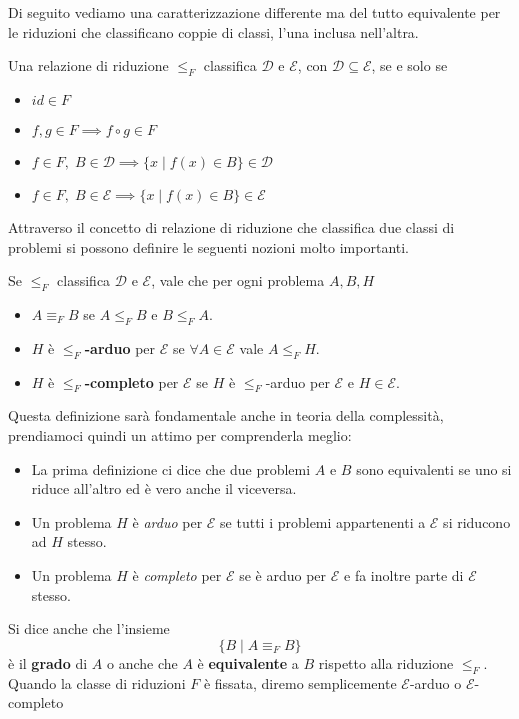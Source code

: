 Di seguito vediamo una caratterizzazione differente ma del tutto
equivalente per le riduzioni che classificano coppie di classi,
l'una inclusa nell'altra.

\begin{lemma} \label{lemma: classificazione}
	Una relazione di riduzione $\leq_F$ classifica $\mathcal{D}$
	e $\mathcal{E}$, con $\mathcal{D} \subseteq \mathcal{E}$, se
	e solo se
	\begin{itemize}
		\item $id \in F$
		\item $f, g \in F \implies f \circ g \in F$
		\item $f \in F, \; B \in \mathcal{D} \implies
			      \{ x \mid f(x) \in B \} \in \mathcal{D}$
		\item $f \in F, \; B \in \mathcal{E} \implies
			      \{ x \mid f(x) \in B \} \in \mathcal{E}$
	\end{itemize}
\end{lemma}

Attraverso il concetto di relazione di riduzione che classifica
due classi di problemi si possono definire le seguenti nozioni
molto importanti.

\begin{definition}
	Se $\leq_F$ classifica $\mathcal{D}$ e $\mathcal{E}$, vale
	che per ogni problema $A, B, H$
	\begin{itemize}
		\item $A \equiv_F B$ se $A \leq_F B$ e $B \leq_F A$.
		\item $H$ è \textbf{$\leq_F$-arduo} per $\mathcal{E}$ se
		      $\forall A \in \mathcal{E}$ vale $A \leq_F H$.
		\item $H$ è \textbf{$\leq_F$-completo} per $\mathcal{E}$
		      se $H$ è $\leq_F$-arduo per $\mathcal{E}$ e
		      $H \in \mathcal{E}$.
	\end{itemize}
\end{definition}

Questa definizione sarà fondamentale anche in teoria della
complessità, prendiamoci quindi un attimo per comprenderla
meglio:
\begin{itemize}
	\item La prima definizione ci dice che due problemi $A$ e
	      $B$ sono equivalenti se uno si riduce all'altro ed è
	      vero anche il viceversa.
	\item Un problema $H$ è \emph{arduo} per $\mathcal{E}$ se
	      tutti i problemi appartenenti a $\mathcal{E}$ si
	      riducono ad $H$ stesso.
	\item Un problema $H$ è \emph{completo} per $\mathcal{E}$ se
	      è arduo per $\mathcal{E}$ e fa inoltre parte di
	      $\mathcal{E}$ stesso.
\end{itemize}
Si dice anche che l'insieme
\[ \{ B \mid A \equiv_F B \} \]
è il \textbf{grado} di $A$ o anche che $A$ è \textbf{equivalente}
a $B$ rispetto alla riduzione $\leq_F$. Quando la classe di
riduzioni $F$ è fissata, diremo semplicemente $\mathcal{E}$-arduo
o $\mathcal{E}$-completo

